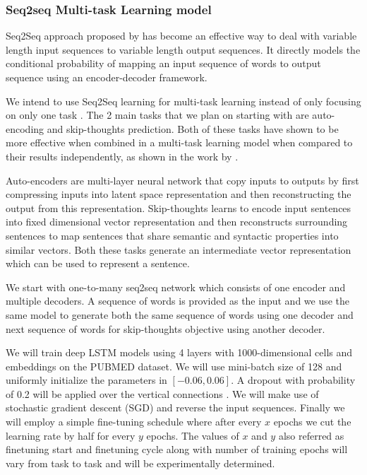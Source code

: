 \documentclass[11pt,a4paper]{article}
\begin{document}
\subsubsection{Seq2seq Multi-task Learning model}
Seq2Seq approach proposed by \citet{britz2017massive} has become an effective way to deal with variable length input sequences to variable length output sequences. It directly models the conditional probability of mapping an input sequence of words to output sequence using an encoder-decoder framework. 
    
We intend to use Seq2Seq learning for multi-task learning instead of only focusing on only one task \cite{luong2015multi}. The 2 main tasks that we plan on starting with are auto-encoding \cite{DBLP:journals/corr/DaiL15a} and skip-thoughts \cite{DBLP:journals/corr/KirosZSZTUF15} prediction. Both of these tasks have shown to be more effective when combined in a multi-task learning model when compared to their results independently, as shown in the work by \citet{luong2015multi}. 
    
Auto-encoders are multi-layer neural network that copy inputs to outputs by first compressing inputs into latent space representation and then reconstructing the output from this representation. Skip-thoughts learns to encode input sentences into fixed dimensional vector representation and then reconstructs surrounding sentences to map sentences that share semantic and syntactic properties into similar vectors. Both these tasks generate an intermediate vector representation which can be used to represent a sentence.
    
We start with one-to-many seq2seq network which consists of one encoder and multiple decoders. A sequence of words is provided as the input and we use the same model to generate both the same sequence of words using one decoder and next sequence of words for skip-thoughts objective using another decoder.
    
We will train deep LSTM models using 4 layers with 1000-dimensional cells and embeddings on the PUBMED dataset. We will use mini-batch size of 128 and uniformly initialize the parameters in $[-0.06, 0.06]$. A dropout with probability of 0.2 will be applied over the vertical connections \cite{DBLP:journals/corr/PhamKL13}. We will make use of stochastic gradient descent (SGD) and reverse the input sequences. Finally we will employ a simple fine-tuning schedule where after every $x$ epochs we cut the learning rate by half for every $y$ epochs. The values of $x$ and $y$ also referred as finetuning start and finetuning cycle along with number of training epochs will vary from task to task and will be experimentally determined. 
    
\end{document}
